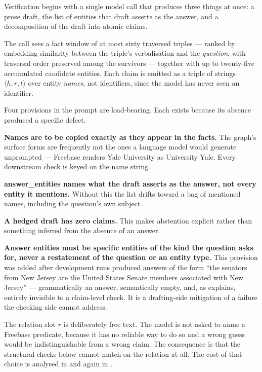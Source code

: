 Verification begins with a single model call that
produces three things at once: a prose draft, the list of entities that draft
asserts as the answer, and a decomposition of the draft into atomic
claims.

The call sees a fact window of at most sixty traversed triples --- ranked by
embedding similarity between the triple's verbalisation and the \emph{question},
with traversal order preserved among the survivors --- together with up to
twenty-five accumulated candidate entities. Each claim is emitted as a triple of
strings $\langle h, r, t \rangle$ over entity \emph{names}, not identifiers,
since the model has never seen an identifier.

Four provisions in the prompt are load-bearing. Each exists because its
absence produced a specific defect.

\textbf{Names are to be copied exactly as they appear in the facts.} The graph's
surface forms are frequently not the ones a language model would generate
unprompted --- Freebase renders Yale University as \textsf{University Yale}.
Every downstream check is keyed on the name string.

\textbf{\textsf{answer\_entities} names what the draft asserts as the answer,
not every entity it mentions.} Without this the list drifts toward a bag of
mentioned names, including the question's own subject.

\textbf{A hedged draft has zero claims.} This makes abstention explicit rather
than something inferred from the absence of an answer.

\textbf{Answer entities must be specific entities of the kind the question asks
for, never a restatement of the question or an entity type.} This provision was
added after development runs produced answers of the form ``the senators from
New Jersey are the United States Senate members associated with New Jersey'' ---
grammatically an answer, semantically empty, and, as
 explains, entirely invisible to a claim-level
check. It is a drafting-side mitigation of a failure the checking side cannot
address.

The relation slot $r$ is deliberately free text. The model is not asked to name
a Freebase predicate, because it has no reliable way to do so and a wrong guess
would be indistinguishable from a wrong claim. The consequence is that the
structural checks below cannot match on the relation at all. The cost of that
choice is analysed in  and again in
.


